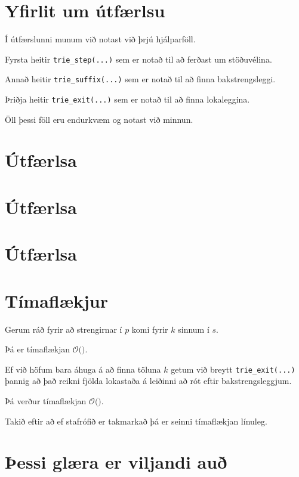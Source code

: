 \section{Yfirlit um útfærlsu}
{
    {
        \item<1-> Í útfærslunni munum við notast við þrjú hjálparföll.
        \item<2-> Fyrsta heitir \texttt{trie\_step(...)} sem er notað til að ferðast um stöðuvélina.
        \item<3-> Annað heitir \texttt{trie\_suffix(...)} sem er notað til að finna bakstrengsleggi.
        \item<4-> Þriðja heitir \texttt{trie\_exit(...)} sem er notað til að finna lokaleggina.
        \item<5-> Öll þessi föll eru endurkvæm og notast við minnun.
    }
}

\section{Útfærlsa}
{
}

\section{Útfærlsa}
{
}

\section{Útfærlsa}
{
}

\section{Tímaflækjur}
{
    {
        \item<1-> Gerum ráð fyrir að strengirnar í $p$ komi fyrir $k$ sinnum í $s$.
        \item<2-> Þá er tímaflækjan $\mathcal{O}($$)$.
        \item<4-> Ef við höfum bara áhuga á að finna töluna $k$ getum við breytt \texttt{trie\_exit(...)}
                    þannig að það reikni fjölda lokastaða á leiðinni að rót eftir bakstrengsleggjum.
        \item<5-> Þá verður tímaflækjan $\mathcal{O}($$)$.
        \item<7-> Takið eftir að ef stafrófið er takmarkað þá er seinni tímaflækjan línuleg.
    }
}

\section{Þessi glæra er viljandi auð}
{
}



